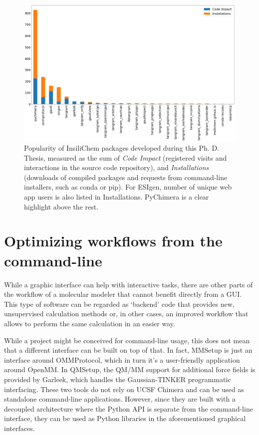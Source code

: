 \begin{figure}[hbtp] %
	\begin{Center}
		\includegraphics[width=\textwidth]{./figures/05/ghstats.png}
	\end{Center}
	\cprotect\caption[Popularity of InsiliChem packages]{Popularity of InsiliChem packages developed during this Ph. D. Thesis, measured as the sum of \textit{Code Impact} (registered visits and interactions in the source code repository), and \textit{Installations} (downloads of compiled packages and requests from command-line installers, such as conda or pip). For ESIgen, number of unique web app users is also listed in Installations. PyChimera is a clear highlight above the rest.}
	\label{fig:ghstats}
\end{figure}


\section{Optimizing workflows from the command-line}
While a graphic interface can help with interactive tasks, there are other parts of the workflow of a molecular modeler that cannot benefit directly from a GUI. This type of software can be regarded as ‘backend’ code that provides new, unsupervised calculation methods or, in other cases, an improved workflow that allows to perform the same calculation in an easier way.

While a project might be conceived for command-line usage, this does not mean that a different interface can be built on top of that. In fact, MMSetup is just an interface around OMMProtocol, which in turn it’s a user-friendly application around OpenMM. In QMSetup, the QM/MM support for additional force fields is provided by Garleek, which handles the Gaussian-TINKER programmatic interfacing. These two tools do not rely on UCSF Chimera and can be used as standalone command-line applications. However, since they are built with a decoupled architecture where the Python API is separate from the command-line interface, they can be used as Python libraries in the aforementioned graphical interfaces.

